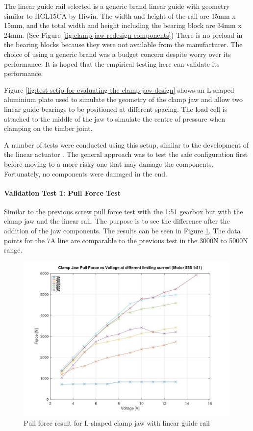 The linear guide rail selected is a generic brand linear guide with geometry similar to HGL15CA by Hiwin. The width and height of the rail are 15mm x 15mm, and the total width and height including the bearing block are 34mm x 24mm. (See Figure \ref{fig:clamp-jaw-redesign-components}) There is no preload in the bearing blocks because they were not available from the manufacturer. The choice of using a generic brand was a budget concern despite worry over its performance. It is hoped that the empirical testing here can validate its performance.


Figure \ref{fig:test-setip-for-evaluating-the-clamp-jaw-design} shows an L-shaped aluminium plate used to simulate the geometry of the clamp jaw and allow two linear guide bearings to be positioned at different spacing. The load cell is attached to the middle of the jaw to simulate the centre of pressure when clamping on the timber joint.

A number of tests were conducted using this setup, similar to the development of the linear actuator . The general approach was to test the safe configuration first before moving to a more risky one that may damage the components. Fortunately, no components were damaged in the end.

\paragraph{Validation Test 1: Pull Force Test}

Similar to the previous screw pull force test with the 1:51 gearbox but with the clamp jaw and the linear rail. The purpose is to see the difference after the addition of the jaw components. The results can be seen in Figure \ref{fig:pull-force-result-1}. The data points for the 7A line are comparable to the previous test in the 3000N to 5000N range.

\begin{figure}[h!]
    \centering
    \includegraphics[width=0.99\textwidth]{images/05/image1.jpg}
    \caption{Pull force result for L-shaped clamp jaw with linear guide rail}
    \label{fig:pull-force-result-1}
\end{figure}

